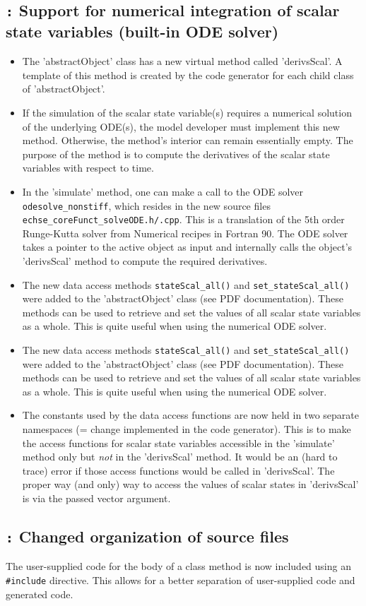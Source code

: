 \documentclass[a4paper,10pt]{article}
\newcommand{\logentry}[2]{\subsection*{\texttt{\color{red}{#1}:} \large{\textbf{#2}}}}
\begin{document}
\logentry{2012-02-05}{Support for numerical integration of scalar state variables (built-in ODE solver)}
\begin{itemize}
  \item The 'abstractObject' class has a new virtual method called 'derivsScal'. A template of this method is created by the code generator for each child class of 'abstractObject'.
  \item If the simulation of the scalar state variable(s) requires a numerical solution of the underlying ODE(s), the model developer must implement this new method. Otherwise, the method's interior can remain essentially empty. The purpose of the method is to compute the derivatives of the scalar state variables with respect to time.
  \item In the 'simulate' method, one can make a call to the ODE solver \verb!odesolve_nonstiff!, which resides in the new source files \verb!echse_coreFunct_solveODE.h/.cpp!. This is a translation of the 5th order Runge-Kutta solver from Numerical recipes in Fortran 90. The ODE solver takes a pointer to the active object as input and internally calls the object's 'derivsScal' method to compute the required derivatives.
  \item The new data access methods \verb!stateScal_all()! and \verb!set_stateScal_all()! were added to the 'abstractObject' class (see PDF documentation). These methods can be used to retrieve and set the values of all scalar state variables as a whole. This is quite useful when using the numerical ODE solver.
  \item The new data access methods \verb!stateScal_all()! and \verb!set_stateScal_all()! were added to the 'abstractObject' class (see PDF documentation). These methods can be used to retrieve and set the values of all scalar state variables as a whole. This is quite useful when using the numerical ODE solver.
  \item The constants used by the data access functions are now held in two separate namespaces (= change implemented in the code generator). This is to make the access functions for scalar state variables accessible in the 'simulate' method only but \emph{not} in the 'derivsScal' method. It would be an (hard to trace) error if those access functions would be called in 'derivsScal'. The proper way (and only) way to access the values of scalar states in 'derivsScal' is via the passed vector argument.
\end{itemize}

\logentry{2012-02-05}{Changed organization of source files}
The user-supplied code for the body of a class method is now included using an \verb!#include! directive. This allows for a better separation of user-supplied code and generated code.
\end{document}
